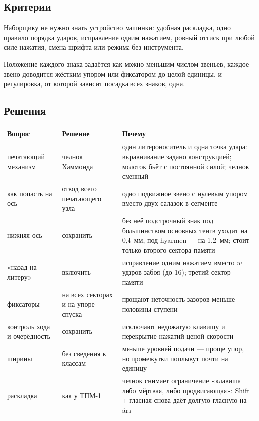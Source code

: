 \subsection{Критерии}

\begin{description}[style=nextline,leftmargin=0pt]
  \item[Простота в эксплуатации.] Наборщику не нужно знать устройство машинки: удобная раскладка, одно правило порядка ударов, исправление одним нажатием, ровный оттиск при любой силе нажатия, смена шрифта или режима без инструмента.
  \item[Точность механизма.] Положение каждого знака задаётся как можно меньшим числом звеньев, каждое звено доводится жёстким упором или фиксатором до целой единицы, и регулировка, от которой зависит посадка всех знаков, одна.
\end{description}

\subsection{Решения}

\begin{center}\small
\begin{tabularx}{\linewidth}{@{}>{\raggedright}p{33mm}>{\raggedright}p{34mm}X@{}}
\toprule
Вопрос & Решение & Почему \\
\midrule
печатающий механизм & челнок Хаммонда & один литероноситель и одна точка удара: выравнивание задано конструкцией; молоток бьёт с постоянной силой; челнок сменный \\
как попасть на ось & отвод всего печатающего узла & одно подвижное звено с нулевым упором вместо двух салазок в сегменте \\
нижняя ось & сохранить & без неё подстрочный знак под большинством основных тенгв уходит на 0,4~мм, под hyarmen — на 1,2~мм; стоит только второго сектора памяти \\
«назад на литеру» & включить & исправление одним нажатием вместо $w$ ударов забоя (до 16); третий сектор памяти \\
фиксаторы & на всех секторах и на упоре спуска & прощают неточность зазоров меньше половины ступени \\
контроль хода и очерёдность & сохранить & исключают недожатую клавишу и перекрытие нажатий ценой скорости \\
ширины & без сведения к классам & меньше уровней подачи — проще упор, но промежутки поплывут почти на единицу \\
раскладка & как у ТПМ-1 & челнок снимает ограничение «клавиша либо мёртвая, либо продвигающая»: Shift + гласная снова даёт долгую гласную на ára \\
\bottomrule
\end{tabularx}
\end{center}


